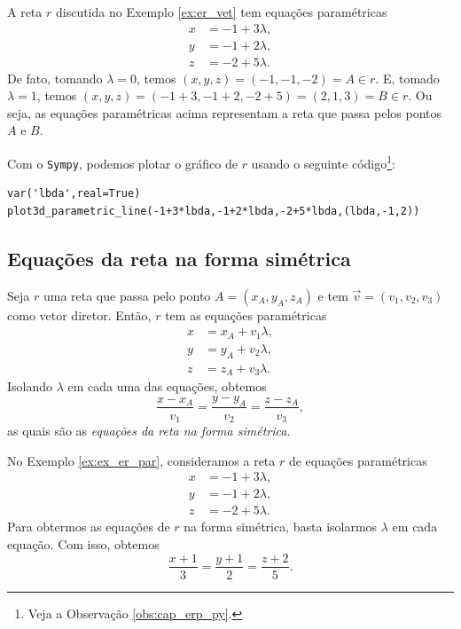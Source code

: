 \begin{ex}\label{ex:ex_er_par}
  A reta $r$ discutida no Exemplo \ref{ex:er_vet} tem equações paramétricas
  \begin{align}
    x &= -1 + 3\lambda,\\
    y &= -1 + 2\lambda,\\
    z &= -2 + 5\lambda.
  \end{align}
  De fato, tomando $\lambda = 0$, temos $(x,y,z) = (-1,-1,-2) = A\in r$. E, tomado $\lambda = 1$, temos $(x,y,z) = (-1+3,-1+2,-2+5) = (2,1,3) = B\in r$. Ou seja, as equações paramétricas acima representam a reta que passa pelos pontos $A$ e $B$.

  \ifispython
  Com o \verb+Sympy+, podemos plotar o gráfico de $r$ usando o seguinte código\footnote{Veja a Observação \ref{obs:cap_erp_py}.}:
\begin{verbatim}
var('lbda',real=True)
plot3d_parametric_line(-1+3*lbda,-1+2*lbda,-2+5*lbda,(lbda,-1,2))
\end{verbatim}
  \fi
\end{ex}

\subsection{Equações da reta na forma simétrica}

Seja $r$ uma reta que passa pelo ponto $A = (x_A,y_A,z_A)$ e tem $\vec{v} = (v_1,v_2,v_3)$ como vetor diretor. Então, $r$ tem as equações paramétricas
\begin{align}
  x &= x_A + v_1\lambda,\\
  y &= y_A + v_2\lambda,\\
  z &= z_A + v_3\lambda.
\end{align}
Isolando $\lambda$ em cada uma das equações, obtemos
\begin{equation}
  \frac{x-x_A}{v_1} = \frac{y-y_A}{v_2} = \frac{z-z_A}{v_3},
\end{equation}
as quais são as \emph{equações da reta na forma simétrica}.

\begin{ex}
  No Exemplo \ref{ex:ex_er_par}, consideramos a reta $r$ de equações paramétricas
  \begin{align}
    x &= -1 + 3\lambda,\\
    y &= -1 + 2\lambda,\\
    z &= -2 + 5\lambda.    
  \end{align}
  Para obtermos as equações de $r$ na forma simétrica, basta isolarmos $\lambda$ em cada equação. Com isso, obtemos
  \begin{equation}
    \frac{x+1}{3} = \frac{y+1}{2} = \frac{z+2}{5}.
  \end{equation}
\end{ex}

